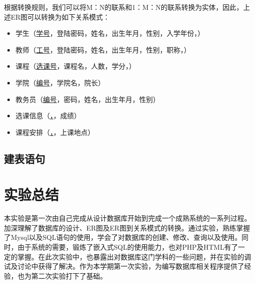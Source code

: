 \documentclass[a4paper, 11pt, nofonts, nocap, fancyhdr]{ctexart}
\begin{document}
根据转换规则，我们可以将M：N的联系和1：M：N的联系转换为实体，因此，上述ER图可以转换为如下关系模式：
\begin{itemize}
    \item 学生（\underline{学号}，登陆密码，姓名，出生年月，性别，入学年份，）
    \item 教师（\underline{工号}，登陆密码，姓名，出生年月，性别，职称，）
    \item 课程（\underline{选课号}，课程名，人数，学分，）
    \item 学院（\underline{编号}，学院名，院长）
    \item 教务员（\underline{编号}，密码，姓名，出生年月，性别）
    \item 选课信息（\underline{，}，成绩）
    \item 课程安排（\underline{，}，上课地点）
\end{itemize}

\subsection{建表语句}



\section{实验总结}

本实验是第一次由自己完成从设计数据库开始到完成一个成熟系统的一系列过程。加深理解了数据库的设计、ER图及ER图到关系模式的转换。通过实验，熟练掌握了Mysql以及SQL语句的使用，学会了对数据库的创建、修改、查询以及使用。同时，由于系统的需要，锻炼了嵌入式SQL的使用能力，也对PHP及HTML有了一定的掌握。在此次实验中，也暴露出对数据库这门学科的一些问题，并在实验的调试及讨论中获得了解决。作为本学期第一次实验，为编写数据库相关程序提供了经验，也为第二次实验打下了基础。
\end{document}
